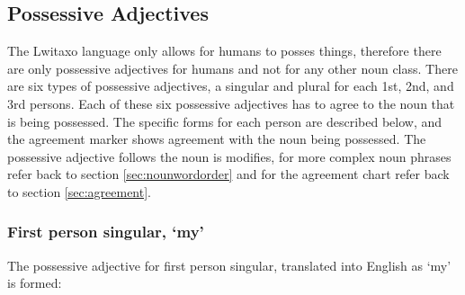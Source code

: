 \noindent\begin{minipage}{\linewidth}
\normalsize
\end{minipage}

\subsection{Possessive Adjectives} \label{sec:possessives}
The Lwitaxo language only allows for humans to posses things, therefore there are only possessive adjectives for humans and not for any other noun class.  There are six types of possessive adjectives, a singular and plural for each 1st, 2nd, and 3rd persons.  Each of these six possessive adjectives has to agree to the noun that is being possessed.  The specific forms for each person are described below, and the agreement marker shows agreement with the noun being possessed.  The possessive adjective follows the noun is modifies, for more complex noun phrases refer back to section \ref{sec:nounwordorder} and for the agreement chart refer back to section \ref{sec:agreement}.

\subsubsection{First person singular, `my'}
The possessive adjective for first person singular, translated into English as `my' is formed:

